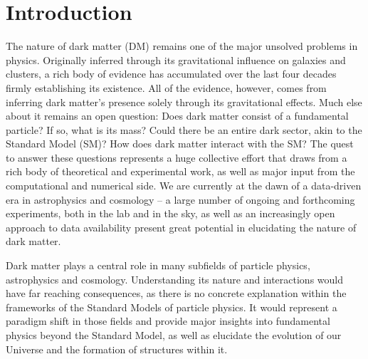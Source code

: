 \chapter{Introduction}
\label{ch:intro}

The nature of dark matter (DM) remains one of the major unsolved problems in physics. Originally inferred through its gravitational influence on galaxies and clusters, a rich body of evidence has accumulated over the last four decades firmly establishing its existence. All of the evidence, however, comes from inferring dark matter's presence solely through its gravitational effects. Much else about it remains an open question: Does dark matter consist  of a fundamental particle? If so, what is its mass? Could there be an entire dark sector, akin to the Standard Model (SM)? How does dark matter interact with the SM? The quest to answer these questions represents a huge collective effort that draws from a rich body of theoretical and experimental work, as well as major input from the computational and numerical side. We are currently at the dawn of a data-driven era in astrophysics and cosmology -- a large number of ongoing and forthcoming experiments, both in the lab and in the sky, as well as an increasingly open approach to data availability present great potential in elucidating the nature of dark matter. 

Dark matter plays a central role in many subfields of particle physics, astrophysics and cosmology. Understanding its nature and interactions would have far reaching consequences, as there is no concrete explanation within the frameworks of the Standard Models of particle physics. It would represent a paradigm shift in those fields and provide major insights into fundamental physics beyond the Standard Model, as well as elucidate the evolution of our Universe and the formation of structures within it. 



